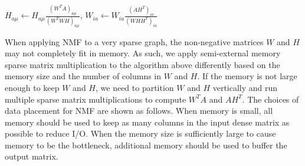 $H_{a\mu} \leftarrow H_{a\mu} \frac{{(W^TA)}_{a\mu}}{{(W^TWH)}_{a\mu}}$,
$W_{ia} \leftarrow W_{ia} \frac{{(AH^T)}_{ia}}{{(WHH^T)}_{ia}}$

When applying NMF to a very sparse graph, the non-negative matrices $W$ and $H$
may not completely fit in memory. As such, we apply semi-external memory sparse
matrix multiplication to the algorithm above differently based on the memory size
and the number of columns in $W$ and $H$. If the memory is not large enough to
keep $W$ and $H$, we need to partition $W$ and $H$ vertically and run multiple
sparse matrix multiplications to compute $W^TA$ and $AH^T$. The choices of data
placement for NMF are shown as follows.
When memory is small, all memory should be used to keep as many
columns in the input dense matrix as possible to reduce I/O.
When the memory size is sufficiently large to cause memory to be
the bottleneck, additional memory should be used to buffer the output
matrix.
